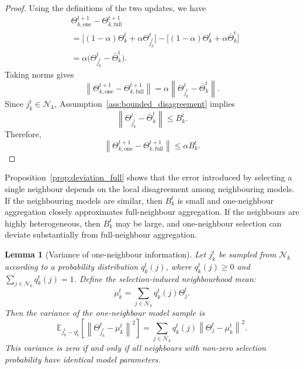\documentclass[conference]{IEEEtran}
\newtheorem{lemma}{Lemma}
\begin{document}
\begin{proof}
Using the definitions of the two updates, we have
\begin{align}
&\Theta_{k,\mathrm{one}}^{t+1}
-
\Theta_{k,\mathrm{full}}^{t+1} \\
&=\big[(1-\alpha)\Theta_k^t
+\alpha\Theta_{j_k^t}^t\big]
-
\big[(1-\alpha)\Theta_k^t
+\alpha\bar{\Theta}_k^t\big] \\
&=\alpha\big(\Theta_{j_k^t}^t-\bar{\Theta}_k^t\big).
\end{align}
Taking norms gives
\begin{equation}
\left\|
\Theta_{k,\mathrm{one}}^{t+1}
-
\Theta_{k,\mathrm{full}}^{t+1}
\right\|
=
\alpha
\left\|
\Theta_{j_k^t}^t-\bar{\Theta}_k^t
\right\|.
    \label{eq:auto-041}
\end{equation}
Since $j_k^t\in\mathcal{N}_k$, Assumption~\ref{ass:bounded_disagreement} implies
\begin{equation}
\left\|
\Theta_{j_k^t}^t-\bar{\Theta}_k^t
\right\|
\leq B_k^t.
    \label{eq:auto-042}
\end{equation}
Therefore,
\begin{equation}
\left\|
\Theta_{k,\mathrm{one}}^{t+1}
-
\Theta_{k,\mathrm{full}}^{t+1}
\right\|
\leq
\alpha B_k^t.
    \label{eq:auto-043}
\end{equation}
\end{proof}

Proposition~\ref{prop:deviation_full} shows that the error introduced by selecting a single neighbour depends on the local disagreement among neighbouring models. If the neighbouring models are similar, then $B_k^t$ is small and one-neighbour aggregation closely approximates full-neighbour aggregation. If the neighbours are highly heterogeneous, then $B_k^t$ may be large, and one-neighbour selection can deviate substantially from full-neighbour aggregation.

\begin{lemma}[Variance of one-neighbour information]
\label{lem:variance_one_neighbour}
Let $j_k^t$ be sampled from $\mathcal{N}_k$ according to a probability distribution $q_k^t(j)$, where $q_k^t(j)\geq 0$ and $\sum_{j\in\mathcal{N}_k}q_k^t(j)=1$. Define the selection-induced neighbourhood mean:
\begin{equation}
\mu_k^t
=
\sum_{j\in\mathcal{N}_k}
q_k^t(j)\Theta_j^t.
    \label{eq:auto-044}
\end{equation}
Then the variance of the one-neighbour model sample is
\begin{equation}
\mathbb{E}_{j_k^t\sim q_k^t}
\left[
\left\|
\Theta_{j_k^t}^t-\mu_k^t
\right\|^2
\right]
=
\sum_{j\in\mathcal{N}_k}
q_k^t(j)
\left\|
\Theta_j^t-\mu_k^t
\right\|^2.
    \label{eq:auto-045}
\end{equation}
This variance is zero if and only if all neighbours with non-zero selection probability have identical model parameters.
\end{lemma}
\end{document}

